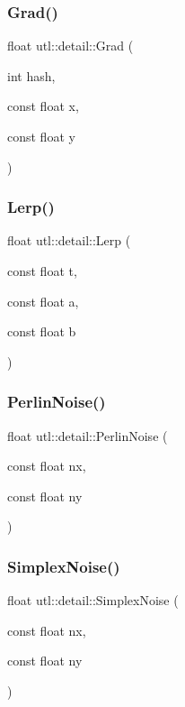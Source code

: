 \subsubsection{\texorpdfstring{Grad()}{Grad()}}
{\footnotesize\ttfamily float utl\+::detail\+::\+Grad (\begin{DoxyParamCaption}\item[{int}]{hash,  }\item[{const float}]{x,  }\item[{const float}]{y }\end{DoxyParamCaption})}

\mbox{\label{namespaceutl_1_1detail_ad7f99771df23814598ee1144880c7ad2}} 
\subsubsection{\texorpdfstring{Lerp()}{Lerp()}}
{\footnotesize\ttfamily float utl\+::detail\+::\+Lerp (\begin{DoxyParamCaption}\item[{const float}]{t,  }\item[{const float}]{a,  }\item[{const float}]{b }\end{DoxyParamCaption})}

\mbox{\label{namespaceutl_1_1detail_a95055be80fb1f302966bd9cc6b275e86}} 
\subsubsection{\texorpdfstring{Perlin\+Noise()}{PerlinNoise()}}
{\footnotesize\ttfamily float utl\+::detail\+::\+Perlin\+Noise (\begin{DoxyParamCaption}\item[{const float}]{nx,  }\item[{const float}]{ny }\end{DoxyParamCaption})}

\mbox{\label{namespaceutl_1_1detail_aadeaa2155f84401999131d8752628c8a}} 
\subsubsection{\texorpdfstring{Simplex\+Noise()}{SimplexNoise()}}
{\footnotesize\ttfamily float utl\+::detail\+::\+Simplex\+Noise (\begin{DoxyParamCaption}\item[{const float}]{nx,  }\item[{const float}]{ny }\end{DoxyParamCaption})}

